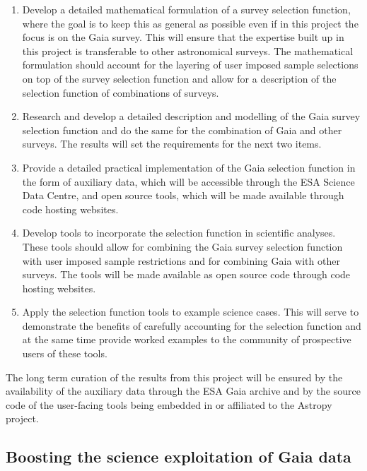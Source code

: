 \begin{enumerate}
    \item Develop a detailed mathematical formulation of a survey selection function, where the goal is to keep this as general as possible even if in this project the focus is on the Gaia survey. This will ensure that the expertise built up in this project is transferable to other astronomical surveys. The mathematical formulation should account for the layering of user imposed sample selections on top of the survey selection function and allow for a description of the selection function of combinations of surveys.
    \item Research and develop a detailed description and modelling of the Gaia survey selection function and do the same for the combination of Gaia and other surveys. The results will set the requirements for the next two items.
    \item Provide a detailed practical implementation of the Gaia selection function in the form of auxiliary data, which will be accessible through the ESA Science Data Centre, and open source tools, which will be made available through code hosting websites. 
    \item Develop tools to incorporate the selection function in scientific analyses. These tools should allow for combining the Gaia survey selection function with user imposed sample restrictions and for combining Gaia with other surveys. The tools will be made available as open source code through code hosting websites.
    \item Apply the selection function tools to example science cases. This will serve to demonstrate the benefits of carefully accounting for the selection function and at the same time provide worked examples to the community of prospective users of these tools.
\end{enumerate}

The long term curation of the results from this project will be ensured by the availability of the auxiliary data through the ESA Gaia archive and by the source code of the user-facing tools being embedded in or affiliated to the Astropy project.

\subsection{Boosting the science exploitation of Gaia data}
\label{sec:needforselectionfunction}

